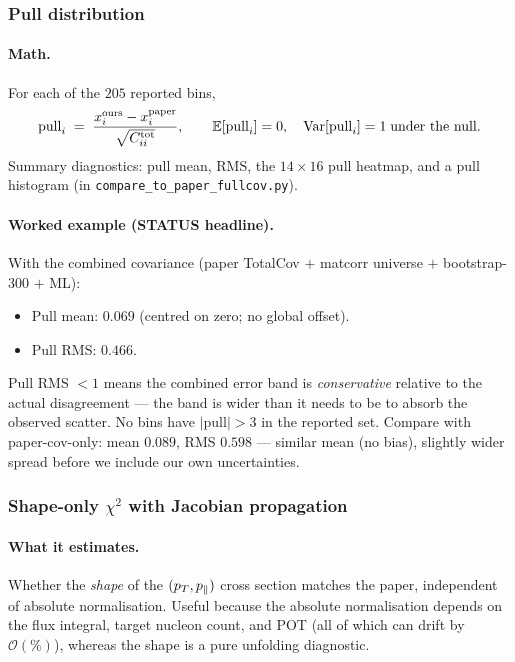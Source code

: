 \subsubsection{Pull distribution}
\label{sec:pull}

\paragraph{Math.}
For each of the $205$ reported bins,
\begin{equation}
\mathrm{pull}_{i}
\;=\;
\frac{x^{\text{ours}}_{i} - x^{\text{paper}}_{i}}{\sqrt{C^{\text{tot}}_{ii}}},
\qquad
\mathbb{E}[\mathrm{pull}_{i}] = 0,\quad
\mathrm{Var}[\mathrm{pull}_{i}] = 1
\;\text{under the null}.
\end{equation}
Summary diagnostics: pull mean, RMS, the $14\times16$ pull heatmap,
and a pull histogram (in \texttt{compare\_to\_paper\_fullcov.py}).

\paragraph{Worked example (STATUS headline).}
With the combined covariance (paper TotalCov $+$ matcorr universe $+$
bootstrap-300 $+$ ML):
\begin{itemize}[nosep]
  \item Pull mean: $\boxed{0.069}$ (centred on zero; no global offset).
  \item Pull RMS: $\boxed{0.466}$.
\end{itemize}
Pull RMS $< 1$ means the combined error band is \emph{conservative}
relative to the actual disagreement --- the band is wider than it
needs to be to absorb the observed scatter. No bins have
$|\mathrm{pull}|>3$ in the reported set. Compare with paper-cov-only:
mean $0.089$, RMS $0.598$ --- similar mean (no bias), slightly wider
spread before we include our own uncertainties.

\subsubsection{Shape-only $\chi^{2}$ with Jacobian propagation}
\label{sec:shape}

\paragraph{What it estimates.}
Whether the \emph{shape} of the $(p_{T},p_{\parallel})$ cross section matches
the paper, independent of absolute normalisation. Useful because the
absolute normalisation depends on the flux integral, target nucleon
count, and POT (all of which can drift by $\mathcal{O}(\%)$), whereas
the shape is a pure unfolding diagnostic.


